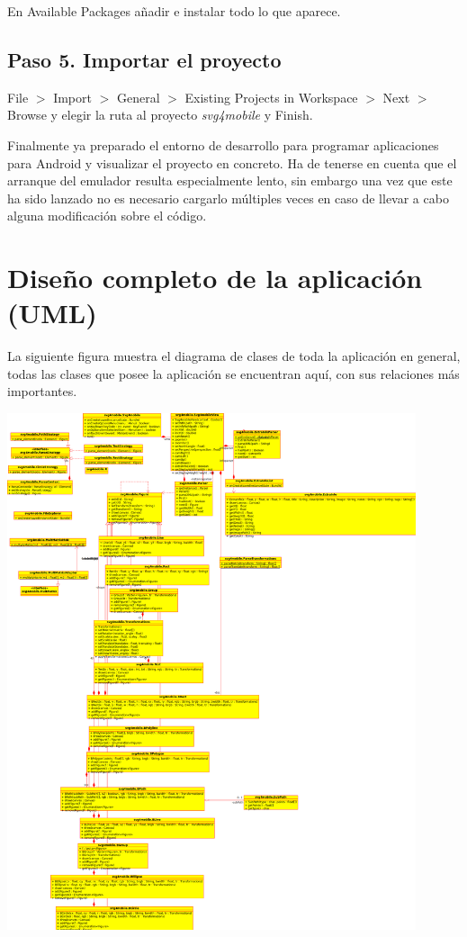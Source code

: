 \documentclass[a4paper,10pt]{article}
\begin{document}
En Available Packages añadir e instalar todo lo que aparece.

\subsection{Paso 5. Importar el proyecto}
File $>$ Import $>$ General $>$ Existing Projects in Workspace $>$ Next $>$ Browse y elegir la ruta al proyecto \textit{svg4mobile} y Finish.

Finalmente ya preparado el entorno de desarrollo para programar aplicaciones para Android y visualizar el proyecto en concreto. Ha de tenerse en cuenta que el arranque del emulador resulta especialmente lento, sin embargo una vez que este ha sido lanzado no es necesario cargarlo múltiples veces en caso de llevar a cabo alguna modificación sobre el código.

\clearpage
\section{Diseño completo de la aplicación (UML)}

La siguiente figura muestra el diagrama de clases de toda la aplicación en general, todas las clases que posee la aplicación se encuentran aquí, con sus relaciones más importantes.

\begin{center}
 \includegraphics[width=12cm]{texres/clases_general.png}
\end{center}
\end{document}
